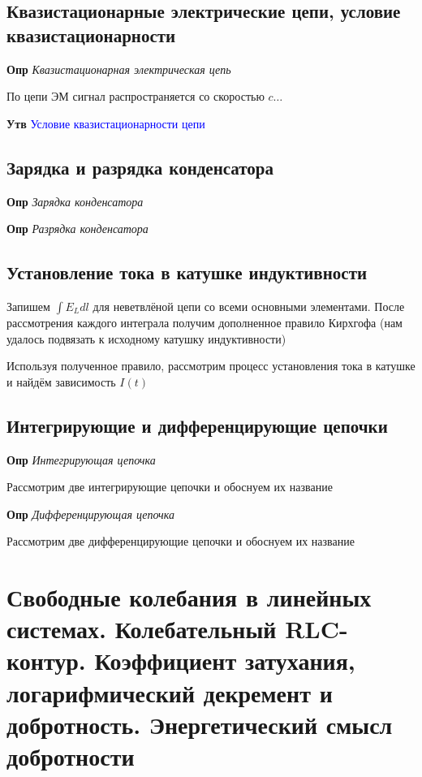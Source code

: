 \documentclass[a4paper, 14pt]{article}
\begin{document}
    \subsection{Квазистационарные электрические цепи, условие квазистационарности}
    
    \textbf{Опр} \textit{Квазистационарная электрическая цепь}
    
    По цепи ЭМ сигнал распространяется со скоростью $c \ldots$
    
    \textbf{Утв} \textcolor{blue}{Условие квазистационарности цепи}
    
    \subsection{Зарядка и разрядка конденсатора}
    
    \textbf{Опр} \textit{Зарядка конденсатора}
    
    \textbf{Опр} \textit{Разрядка конденсатора}
    
    \subsection{Установление тока в катушке индуктивности}
    
    Запишем $\int E_L dl$ для неветвлёной цепи со всеми основными элементами.
    После рассмотрения каждого интеграла получим дополненное правило Кирхгофа (нам удалось подвязать к исходному
    катушку индуктивности)
    
    Используя полученное правило, рассмотрим процесс установления тока в катушке и найдём зависимость $I(t)$
    
    \subsection{Интегрирующие и дифференцирующие цепочки}
    
    \textbf{Опр} \textit{Интегрирующая цепочка}
    
    Рассмотрим две интегрирующие цепочки и обоснуем их название
    
    \textbf{Опр} \textit{Дифференцирующая цепочка}
    
    Рассмотрим две дифференцирующие цепочки и обоснуем их название
    
    \section{Свободные колебания в линейных системах. Колебательный RLC-контур.
    Коэффициент затухания, логарифмический декремент и добротность.
    Энергетический смысл добротности}
    
\end{document}
